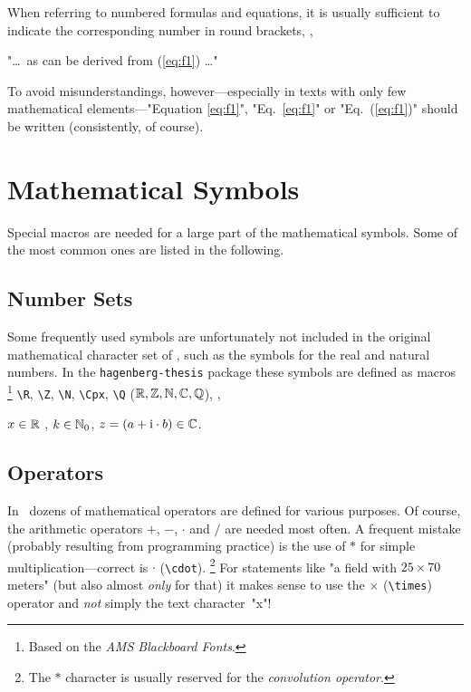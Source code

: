 When referring to numbered formulas and equations, it is usually sufficient
to indicate the corresponding number in round brackets, \eg,
%
\begin{center}
	"\ldots\ as can be derived from (\ref{eq:f1}) \ldots"
\end{center}
%
To avoid misunderstandings, however---especially in texts with only few
mathematical elements---"Equation \ref{eq:f1}", "Eq.~\ref{eq:f1}" or 
"Eq.~(\ref{eq:f1})" should be written (consistently, of course).
%
\begin{center}
	\setlength{\fboxrule}{0.2mm}
	\setlength{\fboxsep}{2mm}
\end{center}


\section{Mathematical Symbols}

Special macros are needed for a large part of the mathematical symbols. Some of
the most common ones are listed  in the following.


\subsection{Number Sets}

Some frequently used symbols are unfortunately not included in the original 
mathematical character set of \latex, such as the symbols for the real and natural 
numbers. In the \texttt{hagenberg-thesis} package these symbols are defined
as macros%
\footnote{Based on the \emph{AMS Blackboard Fonts}.}
\verb!\R!, \verb!\Z!, \verb!\N!, \verb!\Cpx!, \verb!\Q! ($\mathbb{R}, \mathbb{Z}, \mathbb{N}, \mathbb{C}, \mathbb{Q}$),
\eg,
%
\begin{center}
	$x \in \mathbb{R}$ , $k \in \mathbb{N}_0$, $z = (a + \mathrm{i} \cdot b) \in \mathbb{C}$.
\end{center}


\subsection{Operators}

In \latex\ dozens of mathematical operators are defined for various purposes.
Of course, the arithmetic operators $+$, $-$, $\cdot$ and $/$ are needed most often.
A frequent mistake (probably resulting from programming practice) is the use
of $*$ for simple multiplication---correct is $\cdot$ (\verb!\cdot!).%
\footnote{The $*$ character is usually reserved for the \emph{convolution operator}.}
%
For statements like "a field with $25 \times 70$ meters" (but also almost
\emph{only} for that) it makes sense to use the $\times$ (\verb!\times!) operator
and \emph{not} simply the text character~"x"!


